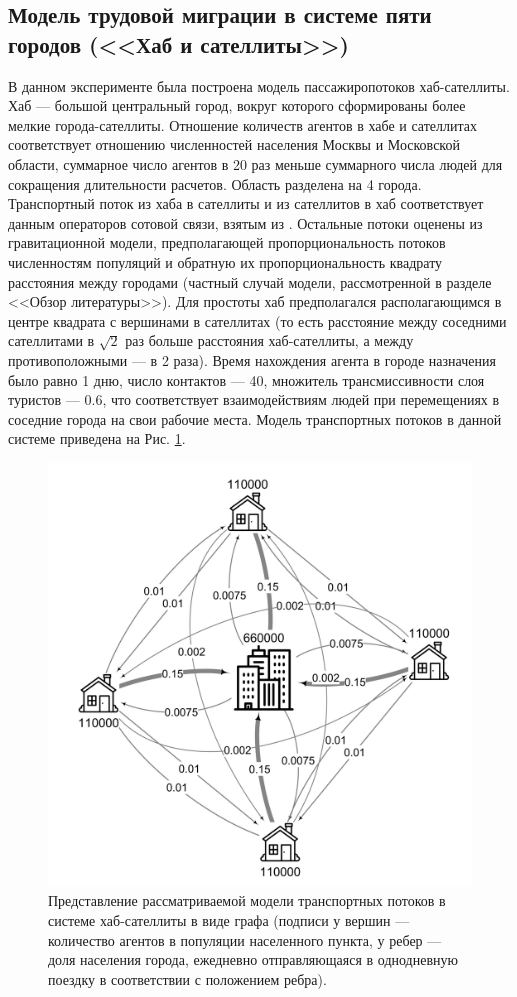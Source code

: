 \documentclass[a4paper,12pt]{article} %
\begin{document}
\subsection{Модель трудовой миграции в системе пяти городов (<<Хаб и сателлиты>>)}
В данном эксперименте была построена модель пассажиропотоков хаб-сателлиты. Хаб --- большой центральный город, вокруг которого сформированы более мелкие города-сателлиты. Отношение количеств агентов в хабе и сателлитах соответствует отношению численностей населения Москвы и Московской области, суммарное число агентов в 20 раз меньше суммарного числа людей для сокращения длительности расчетов. Область разделена на 4 города. Транспортный поток из хаба в сателлиты и из сателлитов в хаб соответствует данным операторов сотовой связи, взятым из \cite{makhrova2017work}. Остальные потоки оценены из гравитационной модели, предполагающей пропорциональность потоков численностям популяций и обратную их пропорциональность квадрату расстояния между городами (частный случай модели, рассмотренной в разделе <<Обзор литературы>>). Для простоты хаб предполагался располагающимся в центре квадрата с вершинами в сателлитах (то есть расстояние между соседними сателлитами в $\sqrt{2}$ раз больше расстояния хаб-сателлиты, а между противоположными --- в 2 раза). Время нахождения агента в городе назначения было равно 1 дню, число контактов --- 40, множитель трансмиссивности слоя туристов --- 0.6, что соответствует взаимодействиям людей при перемещениях в соседние города на свои рабочие места. Модель транспортных потоков в данной системе приведена на Рис. \ref{pic:graph1}. 


\begin{figure}[H]
    \centering
    \includegraphics[width=0.6\linewidth]{images/graph1.png}
    \caption{Представление рассматриваемой модели транспортных потоков в системе хаб-сателлиты в виде графа (подписи у вершин --- количество агентов в популяции населенного пункта, у ребер --- доля населения города, ежедневно отправляющаяся в однодневную поездку в соответствии с положением ребра).}
    \label{pic:graph1}
\end{figure}
\end{document}
